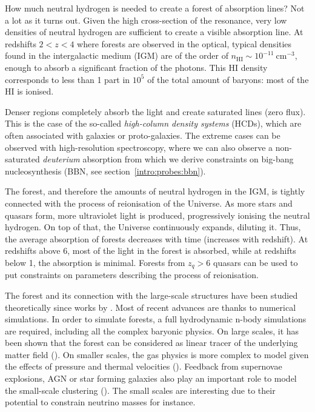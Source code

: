 How much neutral hydrogen is needed to create a forest of \lya 
absorption lines? Not a lot as it turns out. 
Given the high cross-section of the \lya resonance, 
very low densities of neutral hydrogen are sufficient to create a visible absorption line. 
At redshifts $2 < z < 4$ where \lya forests are observed in the optical, 
typical densities found in the intergalactic medium (IGM) are of the order of 
$n_\mathrm{HI} \sim 10^{-11}~\si{\cm}^{-3}$,
enough to absorb a significant fraction of the photons. 
This HI density corresponds to 
less than 1 part in $10^5$ of the total amount of baryons: most of the HI is ionised.

Denser regions completely absorb the light and create saturated lines (zero flux). 
This is the case of the so-called \emph{high-column density systems} (HCDs), 
which are often associated with galaxies or proto-galaxies. The extreme cases 
can be observed with high-resolution spectroscopy, where we can also observe a non-saturated
\emph{deuterium} absorption from which we derive constraints on big-bang nucleosynthesis (BBN, 
see section~\ref{intro:probes:bbn}). 

The \lya forest, and therefore the amounts of neutral hydrogen in the IGM, 
is tightly connected with the process of reionisation of the Universe. 
As more stars and quasars form, more ultraviolet light is produced, 
progressively ionising the neutral hydrogen. On top of that, the Universe
continuously expands, diluting it. 
Thus, the average absorption of forests decreases with time (increases with redshift).
At redshifts above 6, most of the light in the forest is absorbed, 
while at redshifts below 1, the \lya absorption is minimal. 
Forests from $z_q>6$ quasars can be used to put constraints on parameters 
describing the process of reionisation. 

The \lya forest and its connection with the large-scale structures have been studied 
theoretically since works by \cite{gunnDensityNeutralHydrogen1965}. 
Most of recent advances are thanks to numerical simulations. 
In order to simulate forests, 
a full hydrodynamic n-body simulations are required, including all the 
complex baryonic physics. 
On large scales, it has been shown that the forest can be considered as 
linear tracer of the underlying matter field 
(\cite{mcdonaldObservedProbabilityDistribution2000, mcdonaldMeasurementCosmologicalGeometry2003, 
mcdonaldLinearTheoryPower2005}). On smaller scales, the gas physics is more 
complex to model given the effects of pressure and thermal velocities
(\cite{arinyo-i-pratsNonLinearPowerSpectrum2015}).
Feedback from supernovae explosions, AGN or star forming galaxies also play 
an important role to model the small-scale clustering (\cite{chabanierImpactAGNFeedback2020}). 
The small scales are interesting due to their potential to constrain neutrino masses for instance. 

